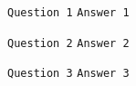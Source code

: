 


\texttt{Question 1}
\texttt{Answer 1}



\texttt{Question 2}
\texttt{Answer 2}



\texttt{Question 3}
\texttt{Answer 3}




